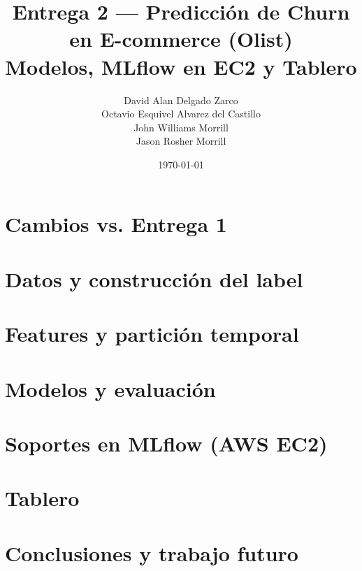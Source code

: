 \documentclass[11pt]{article}
\title{Entrega 2 --- Predicción de Churn en E-commerce (Olist)\\
\large Modelos, MLflow en EC2 y Tablero}
\author{
David Alan Delgado Zarco \\
Octavio Esquivel Alvarez del Castillo \\
John Williams Morrill \\
Jason Rosher Morrill
}
\date{\today}
\begin{document}
\maketitle

\begin{abstract}

\end{abstract}

\section{Cambios vs. Entrega 1}


\section{Datos y construcción del label}


\section{Features y partición temporal}


\section{Modelos y evaluación}


\section{Soportes en MLflow (AWS EC2)}


\section{Tablero}


\section{Conclusiones y trabajo futuro}

\end{document}
